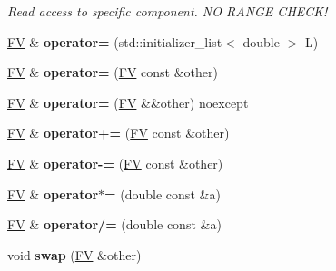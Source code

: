 \begin{DoxyCompactItemize}
\begin{DoxyCompactList}\small\item\em Read access to specific component. N\+O R\+A\+N\+G\+E C\+H\+E\+C\+K! \end{DoxyCompactList}\item 
\hypertarget{classFV_a3ce0839ccafbead03b532cdf4af5d4c1}{}\hyperlink{classFV}{F\+V} \& {\bfseries operator=} (std\+::initializer\+\_\+list$<$ double $>$ L)\label{classFV_a3ce0839ccafbead03b532cdf4af5d4c1}

\item 
\hypertarget{classFV_aa7bad77e8a25ff4d3d769a544eccf314}{}\hyperlink{classFV}{F\+V} \& {\bfseries operator=} (\hyperlink{classFV}{F\+V} const \&other)\label{classFV_aa7bad77e8a25ff4d3d769a544eccf314}

\item 
\hypertarget{classFV_ac95050de7df77088ad31b1c755e2fe33}{}\hyperlink{classFV}{F\+V} \& {\bfseries operator=} (\hyperlink{classFV}{F\+V} \&\&other) noexcept\label{classFV_ac95050de7df77088ad31b1c755e2fe33}

\item 
\hypertarget{classFV_ac30a0c8c757d2e5dbd74131f569f48db}{}\hyperlink{classFV}{F\+V} \& {\bfseries operator+=} (\hyperlink{classFV}{F\+V} const \&other)\label{classFV_ac30a0c8c757d2e5dbd74131f569f48db}

\item 
\hypertarget{classFV_a32a55d4f37e616b0b043282a201aa0f6}{}\hyperlink{classFV}{F\+V} \& {\bfseries operator-\/=} (\hyperlink{classFV}{F\+V} const \&other)\label{classFV_a32a55d4f37e616b0b043282a201aa0f6}

\item 
\hypertarget{classFV_ac50969de8023081218ac2480f4403a4d}{}\hyperlink{classFV}{F\+V} \& {\bfseries operator$\ast$=} (double const \&a)\label{classFV_ac50969de8023081218ac2480f4403a4d}

\item 
\hypertarget{classFV_a8d74f60b130edb26fd62c590ea5ecfce}{}\hyperlink{classFV}{F\+V} \& {\bfseries operator/=} (double const \&a)\label{classFV_a8d74f60b130edb26fd62c590ea5ecfce}

\item 
\hypertarget{classFV_a4e403b1c96be31cc1572c399a61d5933}{}void {\bfseries swap} (\hyperlink{classFV}{F\+V} \&other)\label{classFV_a4e403b1c96be31cc1572c399a61d5933}

\end{DoxyCompactItemize}
